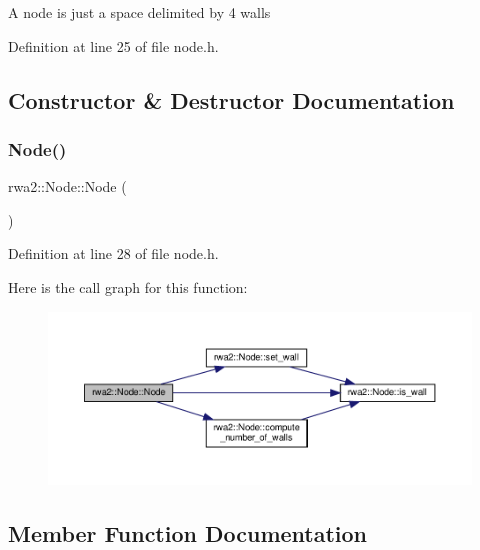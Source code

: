 A node is just a space delimited by 4 walls 

Definition at line 25 of file node.\+h.



\subsection{Constructor \& Destructor Documentation}
\mbox{\label{classrwa2_1_1_node_abc9f6033393b7beee29ea7882a897582}} 
\subsubsection{\texorpdfstring{Node()}{Node()}}
{\footnotesize\ttfamily rwa2\+::\+Node\+::\+Node (\begin{DoxyParamCaption}{ }\end{DoxyParamCaption})\hspace{0.3cm}{\ttfamily [inline]}}



Definition at line 28 of file node.\+h.

Here is the call graph for this function\+:
\nopagebreak
\begin{figure}[H]
\begin{center}
\leavevmode
\includegraphics[width=350pt]{classrwa2_1_1_node_abc9f6033393b7beee29ea7882a897582_cgraph}
\end{center}
\end{figure}


\subsection{Member Function Documentation}
\mbox{\label{classrwa2_1_1_node_a6057b0b97f6b815a57aad534cd021674}} 
